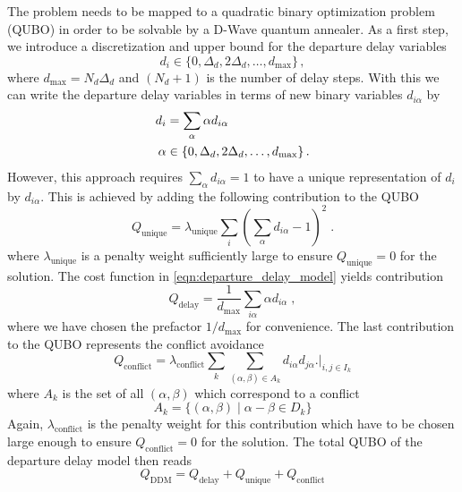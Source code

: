 The problem needs to be mapped to a quadratic binary optimization problem (QUBO) in order to be solvable by a D-Wave quantum annealer.
As a first step, we introduce a discretization and upper bound for the departure delay variables 
\begin{equation*}
    d_i \in \{0, \Delta_d, 2\Delta_d, \dots, d_\text{max} \}\, ,
\end{equation*}
where $d_\text{max} = N_d \Delta_d$ and $(N_d + 1)$ is the number of delay steps.
With this we can write the departure delay variables in terms of new binary variables $d_{i\alpha}$ by
\begin{align}
    d_i & = \sum_\alpha \alpha d_{i\alpha} \notag \\
    \alpha & \in \{0, \Delta_d, 2\Delta_d, \dots, d_\text{max} \}\, . \label{eqn:departure_delay_model_discretization}
\end{align}
However, this approach requires $\sum_\alpha d_{i\alpha} = 1$ to have a unique representation of $d_i$ by $d_{i\alpha}$.
This is achieved by adding the following contribution to the QUBO
\begin{equation}
    \label{eqn:departure_delay_model_qubo_unique}
    Q_\text{unique} = \lambda_\text{unique} \sum_i \left( \sum_\alpha d_{i\alpha} - 1 \right)^2 \; .
\end{equation}
where $\lambda_\text{unique}$ is a penalty weight sufficiently large to ensure $Q_\text{unique}=0$ for the solution.
The cost function in \eqref{eqn:departure_delay_model} yields contribution
\begin{equation}
    \label{eqn:departure_delay_model_qubo_departure}
    Q_\text{delay} = \frac{1}{d_\text{max}}\sum_{i\alpha} \alpha d_{i\alpha} \; ,
\end{equation}
where we have chosen the prefactor $1/d_\text{max}$ for convenience.
The last contribution to the QUBO represents the conflict avoidance
\begin{equation}
    \label{eqn:departure_delay_model_qubo_conflict}
    Q_\text{conflict} = \lambda_\text{conflict} \sum_k \sum_{(\alpha, \beta) \in A_k} d_{i\alpha} d_{j\alpha} \biggl. \biggr|_{i, j \in I_k}
\end{equation}
where $A_k$ is the set of all $(\alpha, \beta)$ which correspond to a conflict
\begin{equation*}
    A_k = \{(\alpha, \beta) \; | \; \alpha - \beta \in D_k\}
\end{equation*}
Again, $\lambda_\text{conflict}$ is the penalty weight for this contribution which have to be chosen large enough to ensure $Q_\text{conflict}=0$ for the solution.
The total QUBO of the departure delay model then reads
\begin{equation*}
    Q_\text{DDM} = Q_\text{delay} + Q_\text{unique} + Q_\text{conflict}
\end{equation*}


